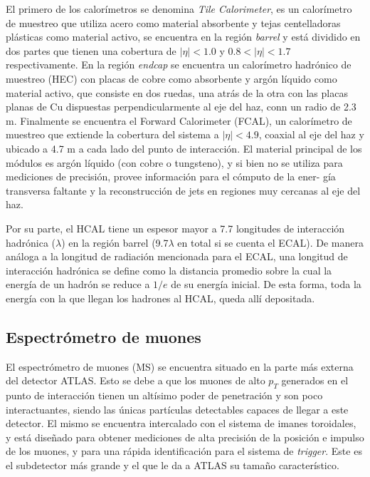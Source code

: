 El primero de los calorímetros se denomina \textit{Tile Calorimeter}, es un calorímetro de muestreo que utiliza acero como material absorbente y tejas centelladoras plásticas como material activo, se encuentra en la región \textit{barrel} y está dividido en dos partes que tienen una cobertura de $|\eta|<1.0$ y $0.8<|\eta|<1.7$ respectivamente. 
En la región \textit{endcap} se encuentra un calorímetro hadrónico de muestreo (HEC) con placas de cobre como absorbente y argón líquido como material activo, que consiste en dos ruedas, una atrás de la otra con las placas planas de Cu dispuestas perpendicularmente al eje del haz, conn un radio de 2.3 m. Finalmente se encuentra el Forward Calorimeter (FCAL), un calorímetro de muestreo que extiende la cobertura del sistema a $|\eta|<4.9$, coaxial
al eje del haz y ubicado a 4.7 m a cada lado del punto de interacción. El material
principal de los módulos es argón líquido (con cobre o tungsteno), y si bien no se
utiliza para mediciones de precisión, provee información para el cómputo de la ener-
gía transversa faltante y la reconstrucción de jets en regiones muy cercanas al eje
del haz.



Por su parte, el HCAL tiene un espesor mayor a 7.7 longitudes de interacción
hadrónica ($\lambda$) en la región barrel (9.7$\lambda$ en total si se cuenta el ECAL). De manera
análoga a la longitud de radiación mencionada para el ECAL, una longitud de
interacción hadrónica se define como la distancia promedio sobre la cual la energía
de un hadrón se reduce a $1/e$ de su energía inicial. De esta forma, toda la energía
con la que llegan los hadrones al HCAL, queda allí depositada.

\subsection{Espectrómetro de muones}

El espectrómetro de muones (MS) se encuentra situado en la parte más externa del detector ATLAS. Esto se debe a que los muones de alto $p_{T}$ generados en el punto de interacción tienen un altísimo poder de penetración y son poco interactuantes, siendo las únicas partículas detectables capaces de llegar a este detector. El mismo se encuentra intercalado con el sistema de imanes toroidales, y está diseñado para obtener mediciones de alta precisión de la posición e impulso de los muones, y para una rápida identificación para el sistema de \textit{trigger}. Este es el subdetector más grande y el que le da a ATLAS su tamaño característico. 

